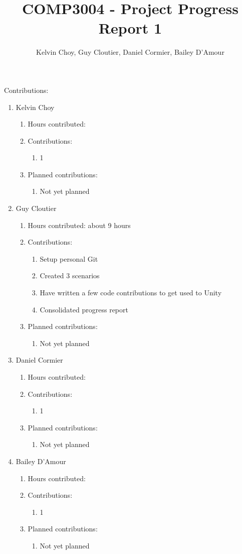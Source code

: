 \documentclass[11pt]{article}
\title{COMP3004 - Project Progress Report 1}
\author{Kelvin Choy, Guy Cloutier, Daniel Cormier, Bailey D'Amour}
\date{}
\begin{document}
\maketitle

Contributions:
\begin{enumerate}
\item Kelvin Choy
\begin{enumerate}
\item Hours contributed:
\item Contributions:
\begin{enumerate}
\item 1
\end{enumerate}
\item Planned contributions:
\begin{enumerate}
\item Not yet planned
\end{enumerate}
\end{enumerate}

\item Guy Cloutier
\begin{enumerate}
\item Hours contributed: about 9 hours
\item Contributions:
\begin{enumerate}
\item Setup personal Git
\item Created 3 scenarios
\item Have written a few code contributions to get used to Unity
\item Consolidated progress report
\end{enumerate}
\item Planned contributions:
\begin{enumerate}
\item Not yet planned
\end{enumerate}
\end{enumerate}

\item Daniel Cormier
\begin{enumerate}
\item Hours contributed:
\item Contributions:
\begin{enumerate}
\item 1
\end{enumerate}
\item Planned contributions:
\begin{enumerate}
\item Not yet planned
\end{enumerate}
\end{enumerate}

\item Bailey D'Amour
\begin{enumerate}
\item Hours contributed:
\item Contributions:
\begin{enumerate}
\item 1
\end{enumerate}
\item Planned contributions:
\begin{enumerate}
\item Not yet planned
\end{enumerate}
\end{enumerate}
\end{enumerate}
\end{document}

